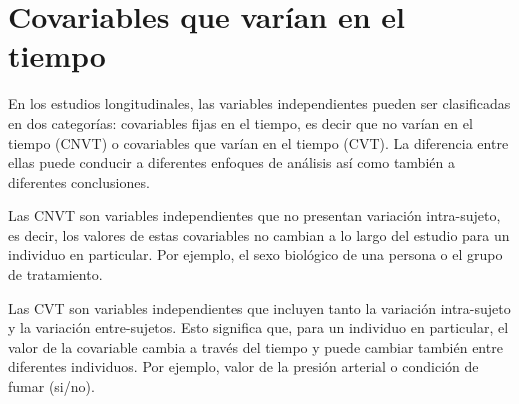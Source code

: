 \documentclass[spanish]{article}
\numberwithin{figure}{subsection}
\numberwithin{equation}{subsection}
\numberwithin{table}{subsection}
\begin{document}





\section{Covariables que varían en el tiempo}

En los estudios longitudinales, las variables independientes pueden ser
clasificadas en dos categorías: covariables fijas en el tiempo, es decir que no
varían en el tiempo (CNVT) o covariables que varían en el tiempo (CVT). La
diferencia entre ellas puede conducir a diferentes enfoques de análisis así
como también a diferentes conclusiones.

Las CNVT son variables independientes que no presentan variación intra-sujeto,
es decir, los valores de estas covariables no cambian a lo largo del estudio
para un individuo en particular. Por ejemplo, el sexo biológico de una persona
o el grupo de tratamiento.

Las CVT son variables independientes que incluyen tanto la variación
intra-sujeto y la variación entre-sujetos. Esto significa que, para un
individuo en particular, el valor de la covariable cambia a través del tiempo y
puede cambiar también entre diferentes individuos. Por ejemplo, valor de la
presión arterial o condición de fumar (si/no).
\end{document}
